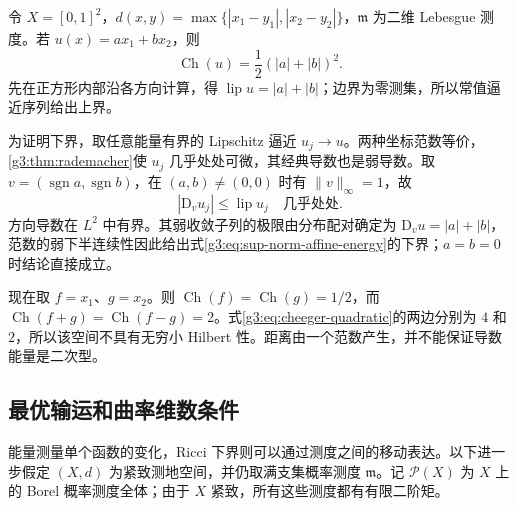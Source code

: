 \begin{example}\label{g3:exm:nonquadratic-norm-energy}
	令 \(X=[0,1]^2\)，\(d(x,y)=\max\{|x_1-y_1|,|x_2-y_2|\}\)，\(\mathfrak m\) 为二维 Lebesgue 测度。若 \(u(x)=ax_1+bx_2\)，则
	\begin{equation}\label{g3:eq:sup-norm-affine-energy}
		\operatorname{Ch}(u)=\frac12(|a|+|b|)^2.
	\end{equation}
	先在正方形内部沿各方向计算，得 \(\operatorname{lip}u=|a|+|b|\)；边界为零测集，所以常值逼近序列给出上界。

	为证明下界，取任意能量有界的 Lipschitz 逼近 \(u_j\to u\)。两种坐标范数等价，\cref{g3:thm:rademacher}使 \(u_j\) 几乎处处可微，其经典导数也是弱导数。取 \(v=(\operatorname{sgn}a,\operatorname{sgn}b)\)，在 \((a,b)\ne(0,0)\) 时有 \(\|v\|_\infty=1\)，故
	\[
		|\mathrm D_vu_j|\le\operatorname{lip}u_j\quad\text{几乎处处}.
	\]
	方向导数在 \(L^2\) 中有界。其弱收敛子列的极限由分布配对确定为 \(\mathrm D_vu=|a|+|b|\)，范数的弱下半连续性因此给出式\eqref{g3:eq:sup-norm-affine-energy}的下界；\(a=b=0\) 时结论直接成立。

	现在取 \(f=x_1\)、\(g=x_2\)。则 \(\operatorname{Ch}(f)=\operatorname{Ch}(g)=1/2\)，而 \(\operatorname{Ch}(f+g)=\operatorname{Ch}(f-g)=2\)。式\eqref{g3:eq:cheeger-quadratic}的两边分别为 \(4\) 和 \(2\)，所以该空间不具有无穷小 Hilbert 性。距离由一个范数产生，并不能保证导数能量是二次型。
\end{example}

\subsection{最优输运和曲率维数条件}
\label{g3:subsec:2904:02}
能量测量单个函数的变化，Ricci 下界则可以通过测度之间的移动表达。以下进一步假定 \((X,d)\) 为紧致测地空间，并仍取满支集概率测度 \(\mathfrak m\)。记 \(\mathcal P(X)\) 为 \(X\) 上的 Borel 概率测度全体；由于 \(X\) 紧致，所有这些测度都有有限二阶矩。


